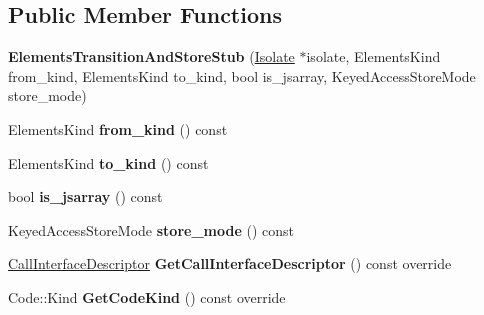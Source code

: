 \subsection*{Public Member Functions}
\begin{DoxyCompactItemize}
\item 
{\bfseries Elements\+Transition\+And\+Store\+Stub} (\hyperlink{classv8_1_1internal_1_1_isolate}{Isolate} $\ast$isolate, Elements\+Kind from\+\_\+kind, Elements\+Kind to\+\_\+kind, bool is\+\_\+jsarray, Keyed\+Access\+Store\+Mode store\+\_\+mode)\hypertarget{classv8_1_1internal_1_1_elements_transition_and_store_stub_ace3e5e07d0a87fbf0b5afc2d0585009f}{}\label{classv8_1_1internal_1_1_elements_transition_and_store_stub_ace3e5e07d0a87fbf0b5afc2d0585009f}

\item 
Elements\+Kind {\bfseries from\+\_\+kind} () const \hypertarget{classv8_1_1internal_1_1_elements_transition_and_store_stub_af81fb9add5f200ab96a5aefc16539d5d}{}\label{classv8_1_1internal_1_1_elements_transition_and_store_stub_af81fb9add5f200ab96a5aefc16539d5d}

\item 
Elements\+Kind {\bfseries to\+\_\+kind} () const \hypertarget{classv8_1_1internal_1_1_elements_transition_and_store_stub_a84cfb3c4c43c0ebbf5e70d6078034bd5}{}\label{classv8_1_1internal_1_1_elements_transition_and_store_stub_a84cfb3c4c43c0ebbf5e70d6078034bd5}

\item 
bool {\bfseries is\+\_\+jsarray} () const \hypertarget{classv8_1_1internal_1_1_elements_transition_and_store_stub_afba39f4b23e594f88a086d5b12be7849}{}\label{classv8_1_1internal_1_1_elements_transition_and_store_stub_afba39f4b23e594f88a086d5b12be7849}

\item 
Keyed\+Access\+Store\+Mode {\bfseries store\+\_\+mode} () const \hypertarget{classv8_1_1internal_1_1_elements_transition_and_store_stub_a47df304f041db24143bad998472cfafd}{}\label{classv8_1_1internal_1_1_elements_transition_and_store_stub_a47df304f041db24143bad998472cfafd}

\item 
\hyperlink{classv8_1_1internal_1_1_call_interface_descriptor}{Call\+Interface\+Descriptor} {\bfseries Get\+Call\+Interface\+Descriptor} () const  override\hypertarget{classv8_1_1internal_1_1_elements_transition_and_store_stub_a07f87731c9ee5044f7e0dd2648a9cacd}{}\label{classv8_1_1internal_1_1_elements_transition_and_store_stub_a07f87731c9ee5044f7e0dd2648a9cacd}

\item 
Code\+::\+Kind {\bfseries Get\+Code\+Kind} () const  override\hypertarget{classv8_1_1internal_1_1_elements_transition_and_store_stub_a5e809064a4bc2d0319e16bc01159e1d3}{}\label{classv8_1_1internal_1_1_elements_transition_and_store_stub_a5e809064a4bc2d0319e16bc01159e1d3}

\end{DoxyCompactItemize}
